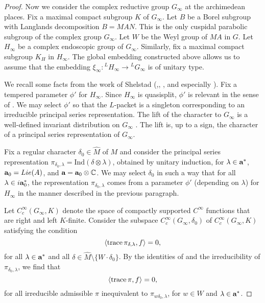 \documentclass{amsart}
\newcommand\tr{\text{trace\,}}
\newcommand\Ind{\text{Ind}}
\newcommand\bfa{\text{\bf a}}
\begin{document}
\begin{proof}
Now we consider the complex reductive
group $G_\infty$ at the archimedean places.
Fix a maximal compact subgroup $K$ of $G_\infty$.  
Let $B$ be
a Borel subgroup with Langlands decomposition $B=MAN$.  This
is the only cuspidal parabolic subgroup of the complex
group $G_\infty$.
Let $W$ be the Weyl group of $MA$ in $G$. 
Let $H_\infty$ be a complex endoscopic group of $G_\infty$.  
Similarly, fix a maximal compact subgroup
$K_H$ in $H_\infty$.  The global embedding constructed above allows
us to assume
that the
embedding $\xi_\infty:{}^LH_\infty \to {}^LG_\infty$ is of unitary type.

We recall some facts from the work of Shelstad (\cite{Sh1},\cite{Sh2},
\cite{Sh4}, and especially \cite{Sh3}).
Fix a tempered parameter $\phi'$ for $H_\infty$.
Since $H_\infty$ is quasisplit, $\phi'$
is relevant in the sense of \cite{B}.
We may select $\phi'$ so that the $L$-packet is a
singleton corresponding to an irreducible principal series
representation.  The lift of the character to $G_\infty$ is a well-defined
invariant distribution on $G_\infty$ 
\cite{Sh3,4.0.1}.  The lift is,
up to a sign, the character of a principal series representation
of $G_\infty$.

Fix a regular character $\delta_0\in \hat M$ of $M$ and consider the
principal series representation $\pi_{\delta_0,\lambda}
	=\Ind(\delta\otimes\lambda)$, obtained by
unitary induction, for $\lambda\in\bfa^*$,
$\bfa_0=Lie(A)$, 
and $\bfa = \bfa_0\otimes {\Bbb C}$. 
We may select $\delta_0$ in such a way that
for all $\lambda\in i\bfa_0^*$, the representation $\pi_{\delta_0,\lambda}$
comes from a parameter $\phi'$ (depending on $\lambda$) for
$H_\infty$ in the manner described in the previous paragraph.

Let $C_c^\infty(G_\infty,K)$ denote the space of compactly
supported $C^\infty$ functions that are right and left $K$-finite.
Consider the subspace $C_c^\infty(G_\infty,\delta_0)$ of 
$C_c^\infty(G_\infty,K)$
satisfying the condition
$$\langle \tr \pi_{\delta,\lambda},f\rangle = 0,$$
for all $\lambda\in \bfa^*$ and all 
$\delta\in \hat M\setminus \{W\cdot \delta_0\}$.  By the identities
of \cite{Vo,6.6.7} and the irreducibility of $\pi_{\delta_0,\lambda}$,
we find that
$$\langle \tr \pi,f\rangle = 0,$$
for all irreducible admissible $\pi$ inequivalent
to $\pi_{w\delta_0,\lambda}$,
for $w\in W$ and $\lambda\in \bfa^*$.  


\end{proof}
\end{document}

